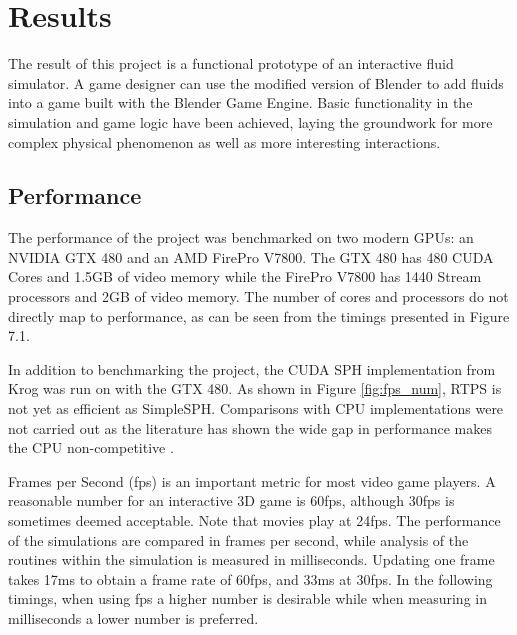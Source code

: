\chapter{Results}

The result of this project is a functional prototype of an interactive fluid
simulator. A game designer can use the modified version of Blender to add
fluids into a game built with the Blender Game Engine. Basic functionality in
the simulation and game logic have been achieved, laying the groundwork for
more complex physical phenomenon as well as more interesting interactions.


\section{Performance}
    
The performance of the project was benchmarked on two modern GPUs: an NVIDIA
GTX 480 and an AMD FirePro V7800. The GTX 480 has 480 CUDA Cores and 1.5GB of
video memory while the FirePro V7800 has 1440 Stream processors and 2GB of
video memory. The number of cores and processors do not directly map to
performance, as can be seen from the timings presented in Figure 7.1.


In addition to benchmarking the project, the CUDA SPH implementation from
Krog\cite{Krog2010} was run on with the GTX 480. As shown in Figure \ref{fig:fps_num}, RTPS is
not yet as efficient as SimpleSPH. Comparisons with CPU implementations were
not carried out as the literature has shown the wide gap in performance makes
the CPU non-competitive \cite{Hoetzlein}\cite{Krog2010}.

Frames per Second (fps) is an important metric for most video game players.  A
reasonable number for an interactive 3D game is 60fps, although 30fps is
sometimes deemed acceptable. Note that movies play at 24fps. The performance of
the simulations are compared in frames per second, while analysis of the
routines within the simulation is measured in milliseconds. Updating one frame
takes 17ms to obtain a frame rate of 60fps, and 33ms at 30fps. In the following
timings, when using fps a higher number is desirable while when measuring in
milliseconds a lower number is preferred.

\pagebreak
\clearpage


